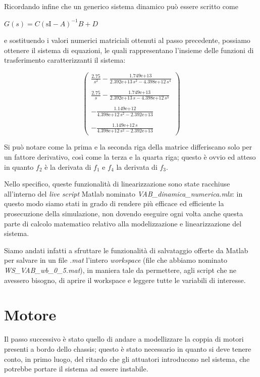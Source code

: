 Ricordando infine che un generico sistema dinamico può essere scritto come

\begin{center}
	$
	G\left(s\right)=C {\left(\mathrm{sI}-A\right)}^{-1} B+D
	$
\end{center}
e sostituendo i valori numerici matriciali ottenuti al passo precedente, possiamo ottenere il sistema di equazioni, le quali rappresentano l'insieme delle funzioni di trasferimento caratterizzanti il sistema:

\begin{center}
		$$
		\left(\begin{array}{c}
		\frac{2.75}{s^2 }-\frac{\text{1.749e+13}}{\text{2.392e+13}\,s^2 -\text{4.398e+12}\,s^4 }\\ \\
		\frac{2.75}{s}-\frac{\text{1.749e+13}}{\text{2.392e+13}\,s-\text{4.398e+12}\,s^3 }\\ \\
		-\frac{\text{1.149e+12}}{\text{4.398e+12}\,s^2 -\text{2.392e+13}}\\ \\
		-\frac{\text{1.149e+12}\,s}{\text{4.398e+12}\,s^2 -\text{2.392e+13}}
		\end{array}\right)
		$$
\end{center}
Si può notare come la prima e la seconda riga della matrice differiscano solo per un fattore derivativo, così come la terza e la quarta riga; questo è ovvio ed atteso in quanto $f_2$ è la derivata di $f_1$ e $f_4$ la derivata di $f_3$.

Nello specifico, queste funzionalità di linearizzazione sono state racchiuse all'interno del \textit{live script} Matlab nominato \textit{VAB\_dinamica\_numerica.mlx}: in questo modo siamo stati in grado di rendere più efficace ed efficiente la prosecuzione della simulazione, non dovendo eseguire ogni volta anche questa parte di calcolo matematico relativo alla modelizzazione e linearizzazione del sistema.

Siamo andati infatti a sfruttare le funzionalità di salvataggio offerte da Matlab per salvare in un file \textit{.mat} l'intero \textit{workspace} (file che abbiamo nominato \textit{WS\_VAB\_wb\_0\_5.mat}), in maniera tale da permettere, agli script che ne avessero bisogno, di aprire il workspace e leggere tutte le variabili di interesse.

\section{Motore}
Il passo successivo è stato quello di andare a modellizzare la coppia di motori presenti a bordo dello chassis; questo è stato necessario in quanto si deve tenere conto, in primo luogo, del ritardo che gli attuatori introducono nel sistema, che potrebbe portare il sistema ad essere instabile.

